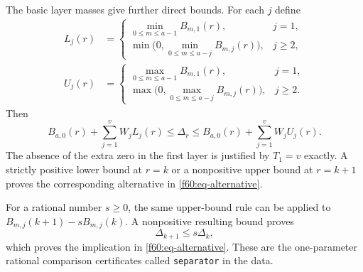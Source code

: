The basic layer masses give further direct bounds.  For each $j$ define
\[
 \begin{split}
 L_j(r)&=\begin{cases}
 \min_{0\le m\le a-1}B_{m,1}(r),&j=1,\\
 \min\bigl(0,\min_{0\le m\le a-j}B_{m,j}(r)\bigr),&j\ge2,
 \end{cases}\\
 U_j(r)&=\begin{cases}
 \max_{0\le m\le a-1}B_{m,1}(r),&j=1,\\
 \max\bigl(0,\max_{0\le m\le a-j}B_{m,j}(r)\bigr),&j\ge2.
 \end{cases}
 \end{split}
\]
Then
\begin{equation}
 B_{a,0}(r)+\sum_{j=1}^{v}W_jL_j(r)
 \le\Delta_r\le
 B_{a,0}(r)+\sum_{j=1}^{v}W_jU_j(r).
 \label{f60:eq-direct-layer}
\end{equation}
The absence of the extra zero in the first layer is justified by
$T_1=v$ exactly.  A strictly positive lower bound at $r=k$ or a
nonpositive upper bound at $r=k+1$ proves the corresponding alternative
in \eqref{f60:eq-alternative}.

For a rational number $s\ge0$, the same upper-bound rule can be applied
to $B_{m,j}(k+1)-sB_{m,j}(k)$.  A nonpositive resulting bound proves
\begin{equation}
 \Delta_{k+1}\le s\Delta_k,
 \label{f60:eq-separator}
\end{equation}
which proves the implication in \eqref{f60:eq-alternative}.  These are
the one-parameter rational comparison certificates called
\texttt{separator} in the data.

